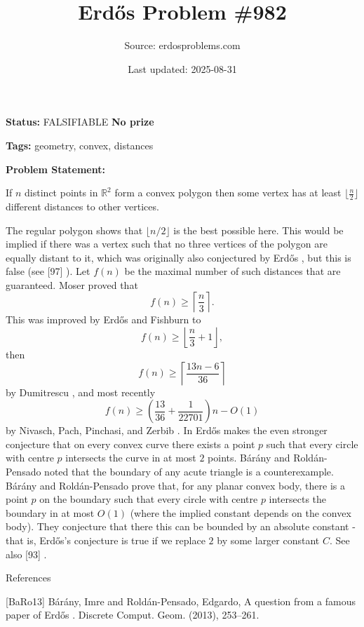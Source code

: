 \documentclass{article}
\title{Erd\H{o}s Problem \#982}
\date{Last updated: 2025-08-31}
\author{Source: erdosproblems.com}
\begin{document}
\maketitle

\noindent\textbf{Status:} FALSIFIABLE \quad \textbf{No prize}

\noindent\textbf{Tags:} geometry, convex, distances

\medskip

\noindent\textbf{Problem Statement:}

If $n$ distinct points in $\mathbb{R}^2$ form a convex polygon then some vertex has at least $\lfloor \frac{n}{2}\rfloor$ different distances to other vertices.




The regular polygon shows that $\lfloor n/2\rfloor$ is the best possible here. This would be implied if there was a vertex such that no three vertices of the polygon are equally distant to it, which was originally also conjectured by Erd\H{o}s \cite{Er46b}, but this is false (see [97] ). Let $f(n)$ be the maximal number of such distances that are guaranteed. Moser \cite{Mo52} proved that\[f(n) \geq \left\lceil\frac{n}{3}\right\rceil.\]This was improved by Erd\H{o}s and Fishburn \cite{ErFi94} to\[f(n) \geq \left\lfloor \frac{n}{3}+1\right\rfloor,\]then\[f(n) \geq \left\lceil \frac{13n-6}{36}\right\rceil\]by Dumitrescu \cite{Du06b}, and most recently\[f(n) \geq \left(\frac{13}{36}+\frac{1}{22701}\right)n-O(1)\]by Nivasch, Pach, Pinchasi, and Zerbib \cite{NPPZ13}. In \cite{Er46b} Erd\H{o}s makes the even stronger conjecture that on every convex curve there exists a point $p$ such that every circle with centre $p$ intersects the curve in at most $2$ points. B\'{a}r\'{a}ny and Rold\'{a}n-Pensado \cite{BaRo13} noted that the boundary of any acute triangle is a counterexample. B\'{a}r\'{a}ny and Rold\'{a}n-Pensado prove that, for any planar convex body, there is a point $p$ on the boundary such that every circle with centre $p$ intersects the boundary in at most $O(1)$ (where the implied constant depends on the convex body). They conjecture that there this can be bounded by an absolute constant - that is, Erd\H{o}s's conjecture is true if we replace $2$ by some larger constant $C$. See also [93] .




References

[BaRo13] B\'{a}r\'{a}ny, Imre and Rold\'{a}n-Pensado, Edgardo, A question from a famous paper of {E}rd\H{o}s . Discrete Comput. Geom. (2013), 253--261.
\end{document}
